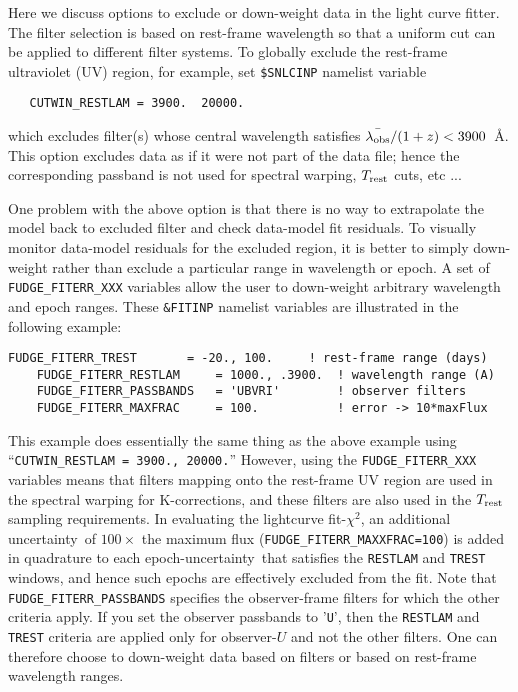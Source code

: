 \documentclass[12pt]{article}
\newcommand{\unc}{uncertainty}
\newcommand{\Trest}{T_{\rm rest}}
\newcommand{\lamobs}{\lambda_{\rm obs}}
\begin{document}
Here we discuss options to exclude or down-weight data
in the light curve fitter.
The filter selection is based on rest-frame wavelength
so that a uniform cut can be applied to different filter systems.
To globally exclude the rest-frame ultraviolet (UV) region, 
for example,  set {\tt \$SNLCINP} namelist variable
%
\begin{verbatim}
   CUTWIN_RESTLAM = 3900.  20000.
\end{verbatim}
%
which excludes filter(s) whose central wavelength 
satisfies $\bar{\lamobs}/(1+z) < 3900$~\AA. This option
excludes data as if it were not part of the data file; 
hence the corresponding passband is not used for
spectral warping, $\Trest$ cuts, etc ...

One problem with the above option is that there is
no way to extrapolate the model back to excluded filter 
and check data-model fit residuals. To visually monitor
data-model residuals for the excluded region,
it is better to simply down-weight rather than exclude
a particular range in wavelength or epoch.
A set of {\tt FUDGE\_FITERR\_XXX} variables allow
the user to down-weight arbitrary wavelength and epoch ranges.
These {\tt \&FITINP} namelist variables are illustrated
in the following example:
%
\begin{Verbatim}[frame=single]
    FUDGE_FITERR_TREST       = -20., 100.     ! rest-frame range (days)
    FUDGE_FITERR_RESTLAM     = 1000., .3900.  ! wavelength range (A)
    FUDGE_FITERR_PASSBANDS   = 'UBVRI'        ! observer filters
    FUDGE_FITERR_MAXFRAC     = 100.           ! error -> 10*maxFlux
\end{Verbatim}
%
This example does essentially the same thing
as the above example using ``{\tt CUTWIN\_RESTLAM = 3900., 20000.}''
However, using the {\tt FUDGE\_FITERR\_XXX} variables means that
filters mapping onto the rest-frame UV region are used in the 
spectral warping for K-corrections, and these filters are also
used in the $\Trest$ sampling requirements.
In evaluating the lightcurve fit-$\chi^2$, 
an additional \unc\ of $100\times$ the maximum flux 
({\tt FUDGE\_FITERR\_MAXXFRAC=100})
is added in quadrature to each epoch-\unc\ that satisfies the 
{\tt RESTLAM} and {\tt TREST} windows, and hence such epochs
are effectively excluded from the fit.  Note that 
{\tt FUDGE\_FITERR\_PASSBANDS} specifies the observer-frame
filters for which the other criteria apply. If you set the
observer passbands to '{\tt U}', then the {\tt RESTLAM} and
{\tt TREST} criteria are applied only for observer-$U$
and not the other filters. One can therefore choose
to down-weight data based on filters or based on
rest-frame wavelength ranges.
\end{document}

